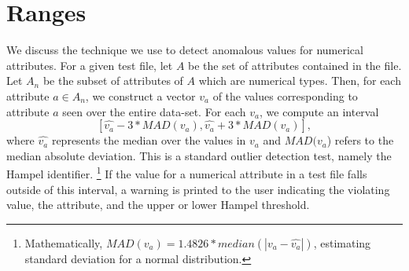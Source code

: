 
\section{Ranges}
\label{sec-learn-ranges}

We discuss the technique we use to detect anomalous values for numerical attributes. For a given test file, let $A$ be the set of attributes contained in the file. Let $A_n$ be the subset of attributes of $A$ which are numerical types. Then, for each attribute $a \in A_n$, we construct a vector $v_a$ of the values corresponding to attribute $a$ seen over the entire data-set. For each $v_a$, we compute an interval  $$[\hat{v_a} - 3*MAD(v_a), \hat{v_a} + 3*MAD(v_a)],$$ 
where $\hat{v_a}$ represents the median over the values in $v_a$ and $MAD(v_a$) refers to the median absolute deviation. This is a standard outlier detection test, namely the Hampel identifier. \footnote{Mathematically, $MAD(v_a) = 1.4826* median(|v_a - \hat{v_a}|)$, estimating standard deviation for a normal distribution.} If the value for a numerical attribute in a test file falls outside of this interval, a warning is printed to the user indicating the violating value, the attribute, and the upper or lower Hampel threshold. 

